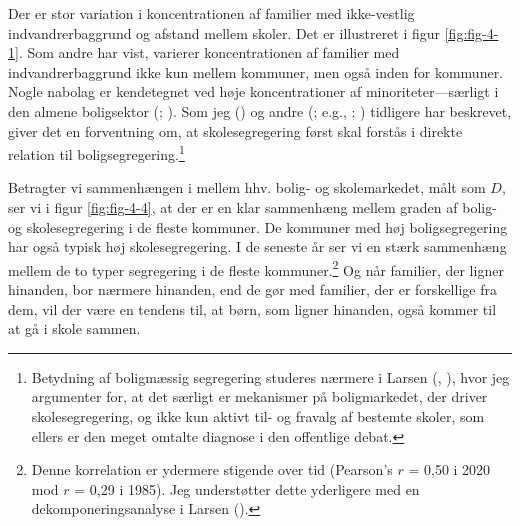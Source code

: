 \documentclass[
]{book}
\begin{document}
Der er stor variation i koncentrationen af familier med ikke-vestlig indvandrerbaggrund og afstand mellem skoler. Det er illustreret i figur \ref{fig:fig-4-1}. Som andre har vist, varierer koncentrationen af familier med indvandrerbaggrund ikke kun mellem kommuner, men også inden for kommuner. Nogle nabolag er kendetegnet ved høje koncentrationer af minoriteter---særligt i den almene boligsektor (; ). Som jeg () og andre (; e.g., ; ) tidligere har beskrevet, giver det en forventning om, at skolesegregering først skal forstås i direkte relation til boligsegregering.\footnote{Betydning af boligmæssig segregering studeres nærmere i Larsen (, ), hvor jeg argumenter for, at det særligt er mekanismer på boligmarkedet, der driver skolesegregering, og ikke kun aktivt til- og fravalg af bestemte skoler, som ellers er den meget omtalte diagnose i den offentlige debat.}

Betragter vi sammenhængen i mellem hhv. bolig- og skolemarkedet, målt som \(D\), ser vi i figur \ref{fig:fig-4-4}, at der er en klar sammenhæng mellem graden af bolig- og skolesegregering i de fleste kommuner. De kommuner med høj boligsegregering har også typisk høj skolesegregering. I de seneste år ser vi en stærk sammenhæng mellem de to typer segregering i de fleste kommuner.\footnote{Denne korrelation er ydermere stigende over tid (Pearson's \(r\) = 0,50 i 2020 mod \(r\) = 0,29 i 1985). Jeg understøtter dette yderligere med en dekomponeringsanalyse i Larsen ().} Og når familier, der ligner hinanden, bor nærmere hinanden, end de gør med familier, der er forskellige fra dem, vil der være en tendens til, at børn, som ligner hinanden, også kommer til at gå i skole sammen.

\newpage
\end{document}
